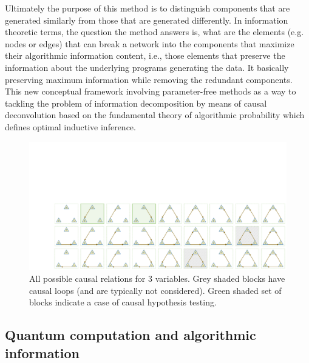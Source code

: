 \documentclass[%
 aps,
 jmp,%
 amsmath,amssymb,
 reprint,%
]{revtex4-2}
\begin{document}
Ultimately the purpose of this method is to distinguish components that are generated similarly from those that are generated differently. 
In information theoretic terms, the question the method answers is, what are the elements (e.g. nodes or edges) that can break a network into the components that maximize their algorithmic information content, i.e., those elements that preserve the information about the underlying programs generating the data.
It basically preserving maximum information while removing the redundant components. 
This new conceptual framework involving parameter-free methods as a way to tackling the problem of information decomposition by means of causal deconvolution based on the fundamental theory of algorithmic probability which defines optimal inductive inference.

\begin{figure}[t!]
	\centering %
	\includegraphics[clip, trim=3cm 0cm 0cm 9cm,width=\textwidth]{plot/3vci.pdf}
	\caption{All possible causal relations for 3 variables. Grey shaded blocks have causal loops (and are typically not considered). Green shaded set of blocks indicate a case of causal hypothesis testing.}
	\label{fig:3vci}
\end{figure}

\subsection{Quantum computation and algorithmic information}
\end{document}

